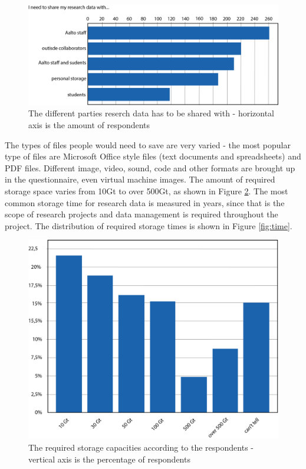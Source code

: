 \begin{figure}
    \begin{centering}
        \includegraphics[width=\textwidth]{images/share_with}
    \end{centering}
    \caption{The different parties reserch data has to be shared with - horizontal axis is the amount of respondents}
    \label{fig:share_with}
\end{figure}

The types of files people would need to save are very varied - the most
popular type of files are Microsoft Office style files (text documents and
spreadsheets) and PDF files. Different image, video, sound, code and other
formats are brought up in the questionnaire, even virtual machine images.
The amount of required storage space varies from 10Gt to over 500Gt, as shown
in Figure \ref{fig:size}. The most
common storage time for research data is measured in years, since that
is the scope of research projects and data management is required throughout
the project. The distribution of required storage times is shown in Figure
\ref{fig:time}.


\begin{figure}
    \begin{centering}
        \includegraphics[width=\textwidth]{images/size}
    \end{centering}
    \caption{The required storage capacities according to the respondents - vertical
             axis is the percentage of respondents}
    \label{fig:size}
\end{figure}

